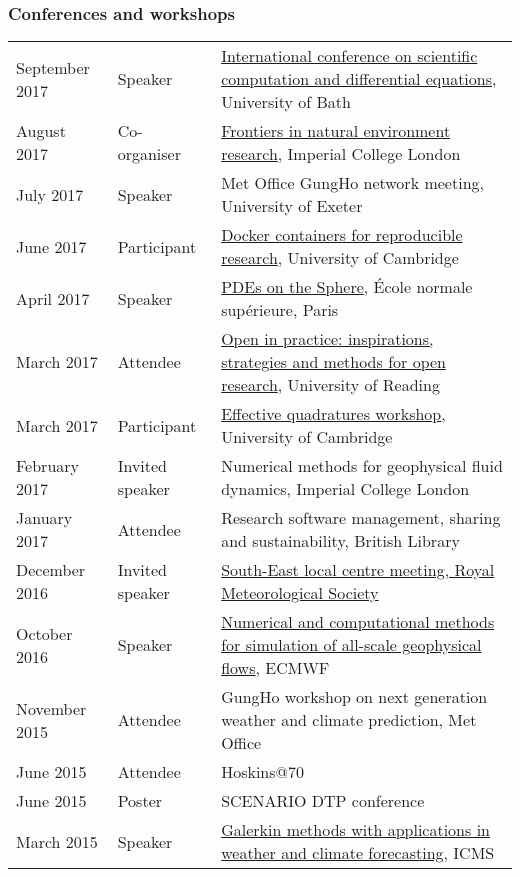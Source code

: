 \documentclass[a4paper,11pt]{article}
\begin{document}
\subsubsection*{Conferences and workshops}
\begin{tabularx}{\linewidth}{l l X}
September 2017 & Speaker & \href{https://sites.google.com/site/scicade2017/}{International conference on scientific computation and differential equations}, University of Bath \\
August 2017 & Co-organiser & \href{https://frontiers2017.wordpress.com/}{Frontiers in natural environment research}, Imperial College London \\
July 2017 & Speaker & Met Office GungHo network meeting, University of Exeter \\
June 2017 & Participant & \href{https://www.software.ac.uk/c4rr}{Docker containers for reproducible research}, University of Cambridge \\
April 2017 & Speaker & \href{https://forge.ipsl.jussieu.fr/heat/wiki/PDEs2017}{PDEs on the Sphere}, École normale supérieure, Paris \\
March 2017 & Attendee & \href{https://blogs.reading.ac.uk/open-research/open-in-practice-inspirations-strategies-and-methods-for-open-research/}{Open in practice: inspirations, strategies and methods for open research}, University of Reading \\
March 2017 & Participant & \href{http://www.effective-quadratures.org/eq2017}{Effective quadratures workshop}, University of Cambridge \\
February 2017 & Invited speaker & Numerical methods for geophysical fluid dynamics, Imperial College London \\
January 2017 & Attendee & Research software management, sharing and sustainability, British Library \\
December 2016 & Invited speaker & \href{https://www.rmets.org/events/meteorological-research-within-university-reading-2016}{South-East local centre meeting, Royal Meteorological Society} \\
October 2016 & Speaker & \href{http://www.ecmwf.int/en/learning/workshops-and-seminars/workshop-numerical-and-computational-methods-simulation-all-scale-geophysical-flows}{Numerical and computational methods for simulation of all-scale geophysical flows}, ECMWF \\
November 2015 & Attendee & GungHo workshop on next generation weather and climate prediction, Met Office \\
June 2015 & Attendee & Hoskins@70 \\
June 2015 & Poster & SCENARIO DTP conference \\
March 2015 & Speaker & \href{http://www.icms.org.uk/workshop.php?id=334}{Galerkin methods with applications in weather and climate forecasting}, ICMS \\
\end{tabularx}
\end{document}
